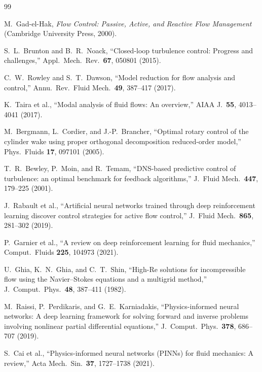 \documentclass[a4paper,11pt]{article}
\begin{document}
\begin{thebibliography}{99}

M.\ Gad-el-Hak,
\textit{Flow Control: Passive, Active, and Reactive Flow Management}
(Cambridge University Press, 2000).

S.\ L.\ Brunton and B.\ R.\ Noack,
``Closed-loop turbulence control: Progress and challenges,''
Appl.\ Mech.\ Rev.\ \textbf{67}, 050801 (2015).

C.\ W.\ Rowley and S.\ T.\ Dawson,
``Model reduction for flow analysis and control,''
Annu.\ Rev.\ Fluid Mech.\ \textbf{49}, 387--417 (2017).

K.\ Taira et al.,
``Modal analysis of fluid flows: An overview,''
AIAA J.\ \textbf{55}, 4013--4041 (2017).

M.\ Bergmann, L.\ Cordier, and J.-P.\ Brancher,
``Optimal rotary control of the cylinder wake using proper orthogonal
decomposition reduced-order model,''
Phys.\ Fluids \textbf{17}, 097101 (2005).

T.\ R.\ Bewley, P.\ Moin, and R.\ Temam,
``DNS-based predictive control of turbulence: an optimal benchmark for
feedback algorithms,''
J.\ Fluid Mech.\ \textbf{447}, 179--225 (2001).

J.\ Rabault et al.,
``Artificial neural networks trained through deep reinforcement learning
discover control strategies for active flow control,''
J.\ Fluid Mech.\ \textbf{865}, 281--302 (2019).

P.\ Garnier et al.,
``A review on deep reinforcement learning for fluid mechanics,''
Comput.\ Fluids \textbf{225}, 104973 (2021).

U.\ Ghia, K.\ N.\ Ghia, and C.\ T.\ Shin,
``High-Re solutions for incompressible flow using the Navier--Stokes
equations and a multigrid method,''
J.\ Comput.\ Phys.\ \textbf{48}, 387--411 (1982).

M.\ Raissi, P.\ Perdikaris, and G.\ E.\ Karniadakis,
``Physics-informed neural networks: A deep learning framework for solving
forward and inverse problems involving nonlinear partial differential
equations,''
J.\ Comput.\ Phys.\ \textbf{378}, 686--707 (2019).

S.\ Cai et al.,
``Physics-informed neural networks (PINNs) for fluid mechanics: A review,''
Acta Mech.\ Sin.\ \textbf{37}, 1727--1738 (2021).


\end{thebibliography}
\end{document}
